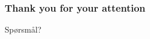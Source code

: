\documentclass{beamer}
\begin{document}


    \begin{frame}
        \frametitle{Thank you for your attention}
        Spørsmål?
    \end{frame}
\end{document}
